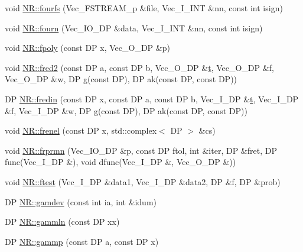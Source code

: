 \begin{DoxyCompactItemize}
\item 
void \mbox{\hyperlink{namespaceNR_a9d15130e265a84a6b1e78c63c1af4e34}{N\+R\+::fourfs}} (Vec\+\_\+\+F\+S\+T\+R\+E\+A\+M\+\_\+p \&file, Vec\+\_\+\+I\+\_\+\+I\+NT \&nn, const int isign)
\item 
void \mbox{\hyperlink{namespaceNR_a71c761e2cf4f3d12a0b1043d5ead1b09}{N\+R\+::fourn}} (Vec\+\_\+\+I\+O\+\_\+\+DP \&data, Vec\+\_\+\+I\+\_\+\+I\+NT \&nn, const int isign)
\item 
void \mbox{\hyperlink{namespaceNR_ab4c354c01223108b1105a957320da065}{N\+R\+::fpoly}} (const DP x, Vec\+\_\+\+O\+\_\+\+DP \&p)
\item 
void \mbox{\hyperlink{namespaceNR_a3c797b9afe1ae3a3469ee3928f625a02}{N\+R\+::fred2}} (const DP a, const DP b, Vec\+\_\+\+O\+\_\+\+DP \&\mbox{\hyperlink{adat__devel_2lib_2hadron_2hadron__timeslice_8cc_ac310d9181e916ba43604099aee272c71}{t}}, Vec\+\_\+\+O\+\_\+\+DP \&f, Vec\+\_\+\+O\+\_\+\+DP \&w, DP g(const DP), DP ak(const DP, const DP))
\item 
DP \mbox{\hyperlink{namespaceNR_a447051a2ce2f777db5fabc349d9d7904}{N\+R\+::fredin}} (const DP x, const DP a, const DP b, Vec\+\_\+\+I\+\_\+\+DP \&\mbox{\hyperlink{adat__devel_2lib_2hadron_2hadron__timeslice_8cc_ac310d9181e916ba43604099aee272c71}{t}}, Vec\+\_\+\+I\+\_\+\+DP \&f, Vec\+\_\+\+I\+\_\+\+DP \&w, DP g(const DP), DP ak(const DP, const DP))
\item 
void \mbox{\hyperlink{namespaceNR_ab068dc64940f5a4907725be35225d5c2}{N\+R\+::frenel}} (const DP x, std\+::complex$<$ DP $>$ \&cs)
\item 
void \mbox{\hyperlink{namespaceNR_a26147c3205dc588fd085cea57df864fe}{N\+R\+::frprmn}} (Vec\+\_\+\+I\+O\+\_\+\+DP \&p, const DP ftol, int \&iter, DP \&fret, DP func(Vec\+\_\+\+I\+\_\+\+DP \&), void dfunc(Vec\+\_\+\+I\+\_\+\+DP \&, Vec\+\_\+\+O\+\_\+\+DP \&))
\item 
void \mbox{\hyperlink{namespaceNR_a4918e1edb5dcbabd728e268dc1502a6e}{N\+R\+::ftest}} (Vec\+\_\+\+I\+\_\+\+DP \&data1, Vec\+\_\+\+I\+\_\+\+DP \&data2, DP \&f, DP \&prob)
\item 
DP \mbox{\hyperlink{namespaceNR_af895f3a51bb42c0b1498571d5a93c807}{N\+R\+::gamdev}} (const int ia, int \&idum)
\item 
DP \mbox{\hyperlink{namespaceNR_aedefa334aaa11250391e7bb4867dc7d5}{N\+R\+::gammln}} (const DP xx)
\item 
DP \mbox{\hyperlink{namespaceNR_ad617f7290581d8abbf35fb5e8206ffc8}{N\+R\+::gammp}} (const DP a, const DP x)
\item 

\end{DoxyCompactItemize}
